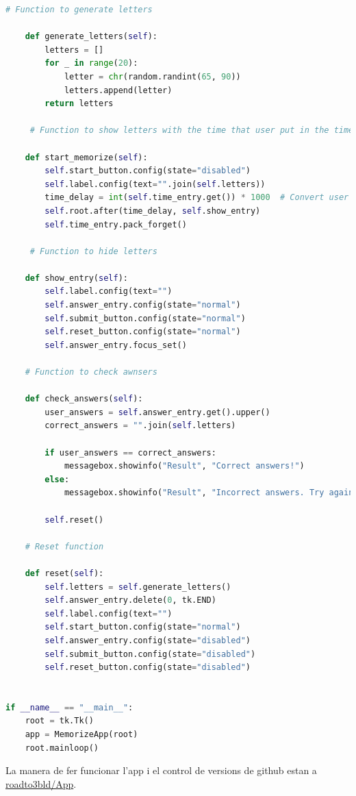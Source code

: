 \begin{lstlisting}[language=Python, style=colorEX, caption=Python example]
     # Function to generate letters

    def generate_letters(self):
        letters = []
        for _ in range(20):
            letter = chr(random.randint(65, 90))
            letters.append(letter)
        return letters
    
     # Function to show letters with the time that user put in the time_entry textbox.

    def start_memorize(self):
        self.start_button.config(state="disabled")
        self.label.config(text="".join(self.letters))
        time_delay = int(self.time_entry.get()) * 1000  # Convert user seconds to milliseconds
        self.root.after(time_delay, self.show_entry)
        self.time_entry.pack_forget()  

     # Function to hide letters

    def show_entry(self):
        self.label.config(text="")
        self.answer_entry.config(state="normal")
        self.submit_button.config(state="normal")
        self.reset_button.config(state="normal")
        self.answer_entry.focus_set()

    # Function to check awnsers 

    def check_answers(self):
        user_answers = self.answer_entry.get().upper()
        correct_answers = "".join(self.letters)

        if user_answers == correct_answers:
            messagebox.showinfo("Result", "Correct answers!")
        else:
            messagebox.showinfo("Result", "Incorrect answers. Try again.")

        self.reset()

    # Reset function

    def reset(self):
        self.letters = self.generate_letters()
        self.answer_entry.delete(0, tk.END)
        self.label.config(text="")
        self.start_button.config(state="normal")
        self.answer_entry.config(state="disabled")
        self.submit_button.config(state="disabled")
        self.reset_button.config(state="disabled")
   

if __name__ == "__main__":
    root = tk.Tk()
    app = MemorizeApp(root)
    root.mainloop()

    \end{lstlisting}


La manera de fer funcionar l'app i el control de versions de github estan a \href{https://polsances13.github.io/roadto3bld/App.Html}{roadto3bld/App}.


\newpage
